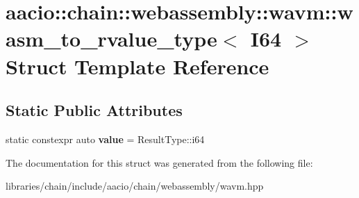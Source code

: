 \hypertarget{structaacio_1_1chain_1_1webassembly_1_1wavm_1_1wasm__to__rvalue__type_3_01_i64_01_4}{}\section{aacio\+:\+:chain\+:\+:webassembly\+:\+:wavm\+:\+:wasm\+\_\+to\+\_\+rvalue\+\_\+type$<$ I64 $>$ Struct Template Reference}
\label{structaacio_1_1chain_1_1webassembly_1_1wavm_1_1wasm__to__rvalue__type_3_01_i64_01_4}
\subsection*{Static Public Attributes}
\begin{DoxyCompactItemize}
\item 
\mbox{\label{structaacio_1_1chain_1_1webassembly_1_1wavm_1_1wasm__to__rvalue__type_3_01_i64_01_4_ae40df3103a0b244124aa5e9c6510f059}} 
static constexpr auto {\bfseries value} = Result\+Type\+::i64
\end{DoxyCompactItemize}


The documentation for this struct was generated from the following file\+:\begin{DoxyCompactItemize}
\item 
libraries/chain/include/aacio/chain/webassembly/wavm.\+hpp\end{DoxyCompactItemize}
